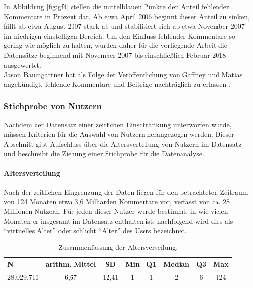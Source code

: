 \documentclass[11pt,a4paper,twoside]{article}
\let\oldpar\paragraph
\renewcommand{\paragraph}{\oldpar*}
\begin{document}
In Abbildung \ref{fig:gf4} stellen die mittelblauen Punkte den Anteil
fehlender Kommentare in Prozent dar. Ab etwa April 2006 beginnt dieser
Anteil zu sinken, fällt ab etwa August 2007 stark ab und stabilisiert
sich ab etwa November 2007 im niedrigen einstelligen Bereich. Um den
Einfluss fehlender Kommentare so gering wie möglich zu halten, wurden
daher für die vorliegende Arbeit die Datensätze beginnend mit November
2007 bis einschließlich Februar 2018 ausgewertet.\\
Jason Baumgartner hat als Folge der Veröffentlichung von Gaffney und
Matias angekündigt, fehlende Kommentare und Beiträge nachträglich zu
erfassen \autocite{Baumgartner2018}.

\hypertarget{stichprobe-von-nutzern}{%
\subsubsection{Stichprobe von Nutzern}\label{stichprobe-von-nutzern}}

Nachdem der Datensatz einer zeitlichen Einschränkung unterworfen wurde,
müssen Kriterien für die Auswahl von Nutzern herangezogen werden. Dieser
Abschnitt gibt Aufschluss über die Altersverteilung von Nutzern im
Datensatz und beschreibt die Ziehung einer Stichprobe für die
Datenanalyse.

\hypertarget{altersverteilung}{%
\paragraph{Altersverteilung}\label{altersverteilung}}

Nach der zeitlichen Eingrenzung der Daten liegen für den betrachteten
Zeitraum von 124 Monaten etwa 3,6 Milliarden Kommentare vor, verfasst
von ca. 28 Millionen Nutzern. Für jeden dieser Nutzer wurde bestimmt, in
wie vielen Monaten er insgesamt im Datensatz enthalten ist; nachfolgend
wird dies als \enquote{virtuelles Alter} oder schlicht \enquote{Alter}
des Users bezeichnet.



\begin{table}

\caption{\label{tab:summary-age-tab}Zusammenfassung der Altersverteilung.}
\centering
\begin{tabular}[t]{lccccccc}
\toprule
N & arithm. Mittel & SD & Min & Q1 & Median & Q3 & Max\\
\midrule
28.029.716 & 6,67 & 12,41 & 1 & 1 & 2 & 6 & 124\\
\bottomrule
\end{tabular}
\end{table}
\end{document}
